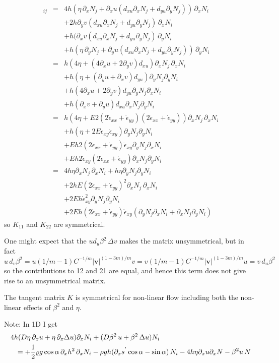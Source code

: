 \documentclass[10pt,a4paper]{book}
\newcommand{\p}{\partial}
\newcommand{\exx}{\dot{\epsilon}_{xx}}
\newcommand{\eyy}{\dot{\epsilon}_{yy}}
\newcommand{\exy}{\dot{\epsilon}_{xy}}
\begin{document}
\begin{eqnarray*}
[K_{11}]_{ij}&=& 4 h  (\eta \, \p_x N_j +\p_x u (d_{xu} \p_x N_j + d_{yu} \p_y N_j  )) \, \p_x N_i \\
& & +2 h                    \p_y v (d_{xu} \p_x N_j + d_{yu} \p_y N_j) \, \p_x N_i \\
& & +                   h ( \p_x v (d_{xu} \p_x N_j + d_{yu} \p_y N_j) \, \p_y N_i  \\
& & + h ( \eta \, \p_y N_j + \p_y u (d_{xu} \p_x N_j + d_{yu} \p_y N_j)) \, \p_y N_i \\
&=&    h  (4 \eta +  (4 \p_x u  + 2 \p_y v)  d_{xu} )  \p_x N_j \, \p_x N_i \\
& &    + h (\eta   + ( \p_y u  + \p_x v ) d_{yu} ) \p_y N_j \p_y N_i \\
& & + h (4  \p_x u  +  2\p_y v ) d_{yu} \p_y N_j \p_x N_i \\
& & + h ( \p_x v + \p_y u)   d_{xu} \p_x N_j \p_y N_i \\
&=&    h  (4 \eta +  E 2 (2 \exx  +  \eyy)  (2\exx+\eyy) )  \p_x N_j \, \p_x N_i \\
& &    +  h (\eta   + 2 E \exy  \exy ) \p_y N_j \p_y N_i \\
& & + E h  2 (2  \exx  +  \eyy ) \exy \p_y N_j \p_x N_i \\
& & +E h 2 \exy   (2 \exx+ \eyy)  \p_x N_j \p_y N_i \\
&=&     4 h \eta   \p_x N_j \, \p_x N_i + h \eta \p_y N_j \p_y N_i \\
& & +  2 h E  (2 \exx  +  \eyy)^2   \p_x N_j \, \p_x N_i \\
& &  +  2 E h  \exy^2  \p_y N_j \p_y N_i \\
& & + 2 E h (2  \exx  +  \eyy ) \exy (\p_y N_j \p_x N_i + \p_x N_j \p_y N_i)
\end{eqnarray*}
so $K_{11}$ and $K_{22}$ are symmetrical.



One might expect that the $u d_u \beta^2 \, \Delta v$ makes the matrix unsymmetrical, but in fact 
\[
u \,d_v \beta^2 = u (1/m-1) C^{-1/m} |\bm{v}|^{(1-3m)/m} v = v (1/m-1) C^{-1/m} |\bm{v}|^{(1-3m)/m} u = v \, d_u \beta^2
\]
so the contributions to 12 and 21 are equal, and hence this term does not give rise to an unsymmetrical matrix.

The tangent matrix $K$ is symmetrical for non-linear flow including both the non-linear effects of $\beta^2$ and $\eta$.


Note: In 1D I get
\begin{eqnarray*}
\lefteqn{4 h ( D\eta \, \p_x u+\eta \, \p_x \Delta u) \p_x N_i +( D \beta^2\, u + \beta^2 \, \Delta u) N_i }\\
& & = +\frac{1}{2} \varrho g  \cos \alpha \, \p_x h^2 \, \p_x N_i - \rho g h (\p_x s^{'} \cos \alpha  -  \sin \alpha )\, N_i
- 4 h \eta \p_x u \p_x N - \beta^2 u \, N
\end{eqnarray*}
\end{document}
